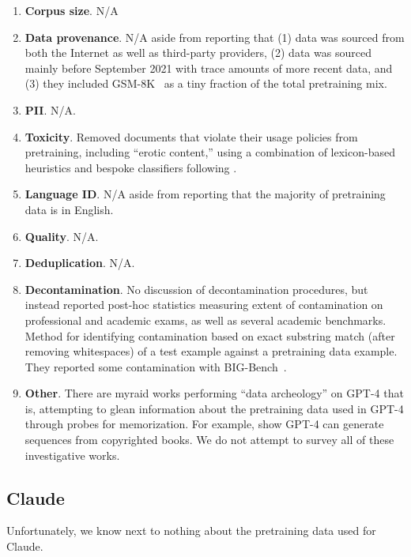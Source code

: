 \documentclass{article}
\begin{document}
\begin{enumerate}
    \item \textbf{Corpus size}. N/A
    \item \textbf{Data provenance}. N/A aside from reporting that (1) data was sourced from both the Internet as well as third-party providers, (2) data was sourced mainly before September 2021 with trace amounts of more recent data, and (3) they included GSM-8K~\citep{Cobbe2021TrainingVT} as a tiny fraction of the total pretraining mix.
    \item \textbf{PII}. N/A.
    \item \textbf{Toxicity}. Removed documents that violate their usage policies from pretraining, including ``erotic content,'' using a combination of lexicon-based heuristics and bespoke classifiers following \citet{markov-2023-holistic-approach-undesired-content-detection}.
    \item \textbf{Language ID}. N/A aside from reporting that the majority of pretraining data is in English.
    \item \textbf{Quality}. N/A.
    \item \textbf{Deduplication}. N/A.
    \item \textbf{Decontamination}. No discussion of decontamination procedures, but instead reported post-hoc statistics measuring extent of contamination on professional and academic exams, as well as several academic benchmarks. Method for identifying contamination based on exact substring match (after removing whitespaces) of a test example against a pretraining data example. They reported some contamination with BIG-Bench~\citep{srivastava2023beyond}.
    \item \textbf{Other}. There are myraid works performing ``data archeology'' on GPT-4 that is, attempting to glean information about the pretraining data used in GPT-4 through probes for memorization. For example, \citet{Chang2023SpeakMA} show GPT-4 can generate sequences from copyrighted books. We do not attempt to survey all of these investigative works.
\end{enumerate}

\subsection{Claude~\citep{claude-announce}}\label{appendix:llm:claude} 

Unfortunately, we know next to nothing about the pretraining data used for Claude. 
\end{document}

